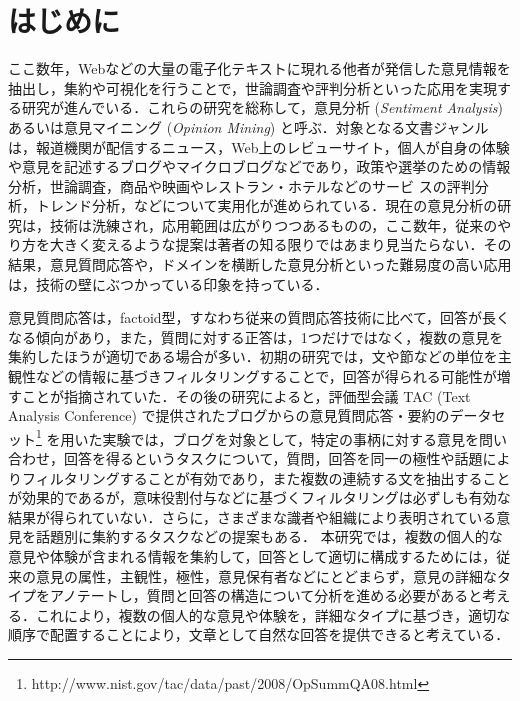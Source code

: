 \documentclass[japanese]{jnlp_1.4}
\begin{document}
\maketitle


\section{はじめに}

ここ数年，Webなどの大量の電子化テキストに現れる他者が発信した意見情報を抽出し，集約や可視化を行うことで，世論調査や評判分析といった応用を実現する研究が進んでいる\cite{pang2008,liu2010,otsuka2007,inui2006}．これらの研究を総称して，意見分析 ({\it Sentiment Analysis}) あるいは意見マイニング ({\it Opinion Mining}) と呼ぶ\cite{pang2008}．対象となる文書ジャンルは，報道機関が配信するニュース，Web上のレビューサイト，個人が自身の体験や意見を記述するブログやマイクロブログなどであり，政策や選挙のための情報分析，世論調査，商品や映画やレストラン・ホテルなどのサービ
スの評判分析，トレンド分析，などについて実用化が進められている．現在の意見分析の研究は，技術は洗練され，応用範囲は広がりつつあるものの，ここ数年，従来のやり方を大きく変えるような提案は著者の知る限りではあまり見当たらない．その結果，意見質問応答や，ドメインを横断した意見分析といった難易度の高い応用は，技術の壁にぶつかっている印象を持っている．

意見質問応答は，factoid型，すなわち従来の質問応答技術に比べて，回答が長くなる傾向があり，また，質問に対する正答は，1つだけではなく，複数の意見を集約したほうが適切である場合が多い．初期の研究\cite{stoyanov2005emnlp}では，文や節などの単位を主観性などの情報に基づきフィルタリングすることで，回答が得られる可能性が増すことが指摘されていた．その後の研究\cite{balahur2010ecai}によると，評価型会議 TAC (Text Analysis Conference) で提供されたブログからの意見質問応答・要約のデータセット\cite{dang2008tac}\footnote{http://www.nist.gov/tac/data/past/2008/OpSummQA08.html} を用いた実験では，ブログを対象として，特定の事柄に対する意見を問い合わせ，回答を得るというタスクについて，質問，回答を同一の極性や話題によりフィルタリングすることが有効であり，また複数の連続する文を抽出することが効果的であるが，意味役割付与などに基づくフィルタリングは必ずしも有効な結果が得られていない．さらに，さまざまな識者や組織により表明されている意見を話題別に集約するタスク\cite{stoy2011ranlp}などの提案もある．
本研究では，複数の個人的な意見や体験が含まれる情報を集約して，回答として適切に構成するためには，従来の意見の属性，主観性，極性，意見保有者などにとどまらず，意見の詳細なタイプをアノテートし，質問と回答の構造について分析を進める必要があると考える．これにより，複数の個人的な意見や体験を，詳細なタイプに基づき，適切な順序で配置することにより，文章として自然な回答を提供できると考えている．
\end{document}
